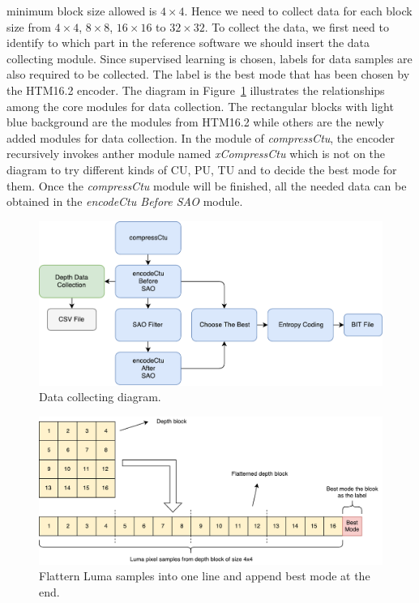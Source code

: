 minimum block size allowed is $4\times4$.
Hence we need to collect data for each block size from 
$4\times4$, \(8\times8\), $16\times16$ to $32\times32$.
To collect the data, we first need to identify
to which part in the reference software
we should insert the data collecting module.
Since supervised learning is chosen,
labels for data samples are also required to be collected.
The label is the best mode that has been chosen by the HTM16.2 encoder.
The diagram in Figure~\ref{fig:data-collection-diagram} illustrates
the relationships among the core modules for data collection.
The rectangular blocks with light blue background are the modules from
HTM16.2 while others are the newly added modules for data collection.
In the module of \emph{compressCtu}, the encoder recursively invokes
anther module named \emph{xCompressCtu} which is not on the diagram to
try different kinds of CU, PU, TU and to decide the best mode for them.
Once the \emph{compressCtu} module will be finished, all the needed
data can be obtained in the \emph{encodeCtu Before SAO} module.
\begin{figure}
    \centering
    \includegraphics[width=\textwidth,height=\textheight,keepaspectratio]{Figures/thesis-data-collecting-diagram.pdf}
    \caption[Data collecting diagram]{Data collecting diagram.}
    \label{fig:data-collection-diagram}
\end{figure}
\begin{figure}
    \centering
    \includegraphics[width=\textwidth,height=\textheight,keepaspectratio]{Figures/flattern-pixels-into-single-line.pdf}
    \caption[Flattern Luma samples into one line and append best mode at the end]{Flattern Luma samples into one line and append best mode at the end.}
    \label{fig:flattern-data-into-one-dimension}
\end{figure}

